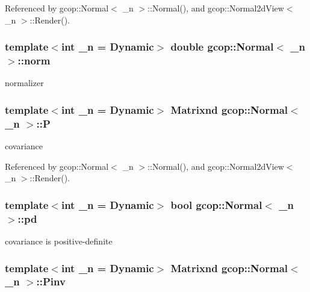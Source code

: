 \-Referenced by gcop\-::\-Normal$<$ \-\_\-n $>$\-::\-Normal(), and gcop\-::\-Normal2d\-View$<$ \-\_\-n $>$\-::\-Render().

\subsubsection[{norm}]{\setlength{\rightskip}{0pt plus 5cm}template$<$int \-\_\-n = \-Dynamic$>$ double {\bf gcop\-::\-Normal}$<$ \-\_\-n $>$\-::{\bf norm}}\label{classgcop_1_1Normal_a51ae242f8461c027fb5f160363ffc9a9}


normalizer 

\subsubsection[{\-P}]{\setlength{\rightskip}{0pt plus 5cm}template$<$int \-\_\-n = \-Dynamic$>$ {\bf \-Matrixnd} {\bf gcop\-::\-Normal}$<$ \-\_\-n $>$\-::{\bf \-P}}\label{classgcop_1_1Normal_ab06ae81a539288ac586d528f0157ee67}


covariance 



\-Referenced by gcop\-::\-Normal$<$ \-\_\-n $>$\-::\-Normal(), and gcop\-::\-Normal2d\-View$<$ \-\_\-n $>$\-::\-Render().

\subsubsection[{pd}]{\setlength{\rightskip}{0pt plus 5cm}template$<$int \-\_\-n = \-Dynamic$>$ bool {\bf gcop\-::\-Normal}$<$ \-\_\-n $>$\-::{\bf pd}}\label{classgcop_1_1Normal_ab49a4a70dea751c2e48ec93260f3d797}


covariance is positive-\/definite 

\subsubsection[{\-Pinv}]{\setlength{\rightskip}{0pt plus 5cm}template$<$int \-\_\-n = \-Dynamic$>$ {\bf \-Matrixnd} {\bf gcop\-::\-Normal}$<$ \-\_\-n $>$\-::{\bf \-Pinv}}\label{classgcop_1_1Normal_ab96efa301b00021f92eea26b1609d176}


